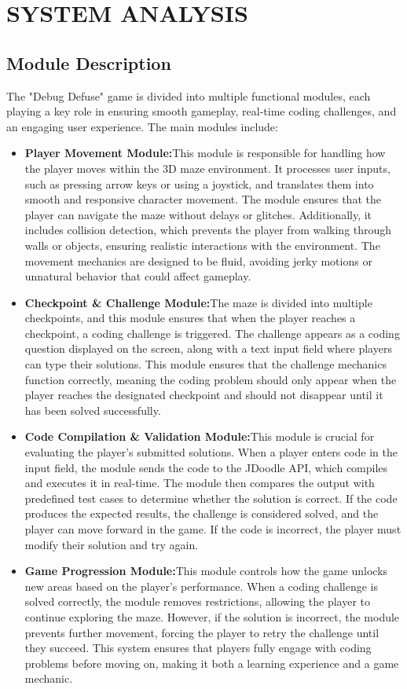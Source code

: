 \chapter{SYSTEM ANALYSIS }
 
 \section{Module Description}
 The "Debug Defuse" game is divided into multiple functional modules, each playing a key role in ensuring smooth gameplay, real-time coding challenges, and an engaging user experience. The main modules include:
 \begin{itemize}
    \item \textbf{Player Movement Module:}This module is responsible for handling how the player moves within the 3D maze environment. It processes user inputs, such as pressing arrow keys or using a joystick, and translates them into smooth and responsive character movement. The module ensures that the player can navigate the maze without delays or glitches. Additionally, it includes collision detection, which prevents the player from walking through walls or objects, ensuring realistic interactions with the environment. The movement mechanics are designed to be fluid, avoiding jerky motions or unnatural behavior that could affect gameplay.
    \item \textbf{Checkpoint \& Challenge Module:}The maze is divided into multiple checkpoints, and this module ensures that when the player reaches a checkpoint, a coding challenge is triggered. The challenge appears as a coding question displayed on the screen, along with a text input field where players can type their solutions. This module ensures that the challenge mechanics function correctly, meaning the coding problem should only appear when the player reaches the designated checkpoint and should not disappear until it has been solved successfully.
    \item \textbf{Code Compilation \& Validation Module:}This module is crucial for evaluating the player’s submitted solutions. When a player enters code in the input field, the module sends the code to the JDoodle API, which compiles and executes it in real-time. The module then compares the output with predefined test cases to determine whether the solution is correct. If the code produces the expected results, the challenge is considered solved, and the player can move forward in the game. If the code is incorrect, the player must modify their solution and try again.
    \item \textbf{Game Progression Module:}This module controls how the game unlocks new areas based on the player’s performance. When a coding challenge is solved correctly, the module removes restrictions, allowing the player to continue exploring the maze. However, if the solution is incorrect, the module prevents further movement, forcing the player to retry the challenge until they succeed. This system ensures that players fully engage with coding problems before moving on, making it both a learning experience and a game mechanic.

\end{itemize}
